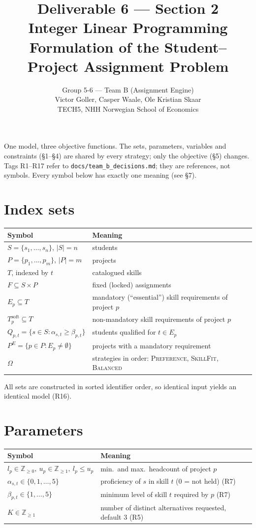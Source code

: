 \documentclass[11pt,a4paper]{article}
\title{Deliverable 6 --- Section 2\\[0.3em]
\large Integer Linear Programming Formulation of the Student--Project Assignment Problem}
\author{Group 5-6 --- Team B (Assignment Engine)\\
Victor Goller, Casper Waale, Ole Kristian Skaar\\
TECH5, NHH Norwegian School of Economics}
\date{}
\newcommand{\soft}{\mathrm{soft}}
\begin{document}
\maketitle

\noindent One model, three objective functions. The sets, parameters, variables and constraints (\S1--\S4) are
shared by every strategy; only the objective (\S5) changes. Tags R1--R17 refer to \texttt{docs/team\_b\_decisions.md};
they are references, not symbols. Every symbol below has exactly one meaning (see \S7).

\section{Index sets}
\begin{tabular}{ll}
\toprule
Symbol & Meaning \\
\midrule
$S = \{s_1,\dots,s_n\}$, $|S| = n$ & students \\
$P = \{p_1,\dots,p_m\}$, $|P| = m$ & projects \\
$T$, indexed by $t$ & catalogued skills \\
$F \subseteq S \times P$ & fixed (locked) assignments \\
$E_p \subseteq T$ & mandatory (``essential'') skill requirements of project $p$ \\
$T_p^{\soft} \subseteq T$ & non-mandatory skill requirements of project $p$ \\
$Q_{p,t} = \{s \in S : \alpha_{s,t} \ge \beta_{p,t}\}$ & students qualified for $t \in E_p$ \\
$P^{E} = \{p \in P : E_p \neq \emptyset\}$ & projects with a mandatory requirement \\
$\Omega$ & strategies in order: \textsc{Preference}, \textsc{SkillFit}, \textsc{Balanced} \\
\bottomrule
\end{tabular}

\medskip\noindent
All sets are constructed in sorted identifier order, so identical input yields an identical model (R16).

\section{Parameters}
\begin{tabular}{ll}
\toprule
Symbol & Meaning \\
\midrule
$l_p \in \mathbb{Z}_{\ge 0},\ u_p \in \mathbb{Z}_{\ge 1},\ l_p \le u_p$ & min.\ and max.\ headcount of project $p$ \\
$\alpha_{s,t} \in \{0,1,\dots,5\}$ & proficiency of $s$ in skill $t$ ($0$ = not held) (R7) \\
$\beta_{p,t} \in \{1,\dots,5\}$ & minimum level of skill $t$ required by $p$ (R7) \\
$K \in \mathbb{Z}_{\ge 1}$ & number of distinct alternatives requested, default $3$ (R5) \\
\bottomrule
\end{tabular}
\end{document}
